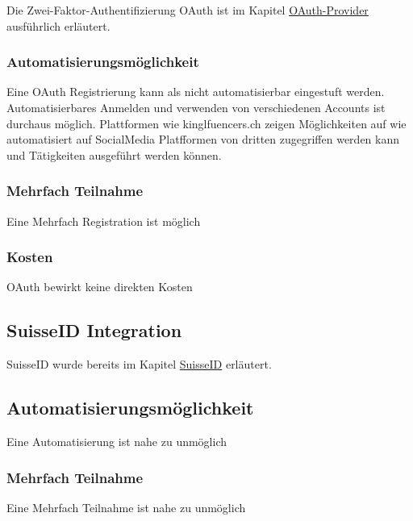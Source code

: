 Die Zwei-Faktor-Authentifizierung OAuth ist im Kapitel
\protect\hyperlink{oauth-provider}{OAuth-Provider} ausführlich
erläutert.

\subsubsection{Automatisierungsmöglichkeit}\label{automatisierungsmuxf6glichkeit-6}

Eine OAuth Registrierung kann als nicht automatisierbar eingestuft
werden. Automatisierbares Anmelden und verwenden von verschiedenen
Accounts ist durchaus möglich. Plattformen wie kinglfuencers.ch zeigen
Möglichkeiten auf wie automatisiert auf SocialMedia Platfformen von
dritten zugegriffen werden kann und Tätigkeiten ausgeführt werden
können.

\subsubsection{Mehrfach Teilnahme}\label{mehrfach-teilnahme-6}

Eine Mehrfach Registration ist möglich

\subsubsection{Kosten}\label{kosten-7}

OAuth bewirkt keine direkten Kosten

\subsection{SuisseID Integration}\label{suisseid-integration}

SuisseID wurde bereits im Kapitel \protect\hyperlink{suisseid}{SuisseID}
erläutert.

\subsection{Automatisierungsmöglichkeit}\label{automatisierungsmuxf6glichkeit-7}

Eine Automatisierung ist nahe zu unmöglich

\subsubsection{Mehrfach Teilnahme}\label{mehrfach-teilnahme-7}

Eine Mehrfach Teilnahme ist nahe zu unmöglich

